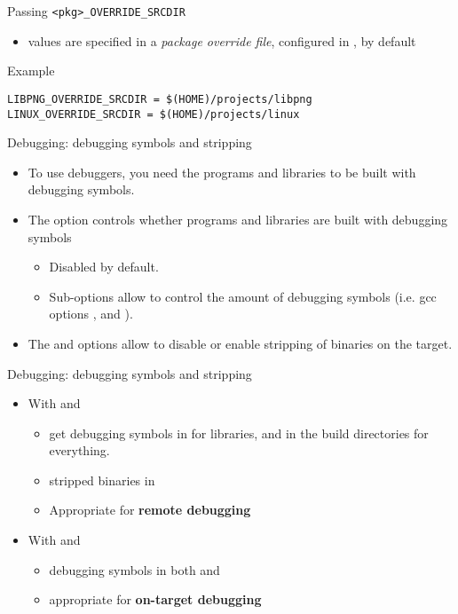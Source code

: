 \begin{frame}[fragile]{Passing {\tt <pkg>\_OVERRIDE\_SRCDIR}}
  \begin{itemize}
  \item {} values are specified in a {\em
      package override file}, configured in
    , by default
  \end{itemize}

  \begin{block}{Example }
\begin{verbatim}
LIBPNG_OVERRIDE_SRCDIR = $(HOME)/projects/libpng
LINUX_OVERRIDE_SRCDIR = $(HOME)/projects/linux
\end{verbatim}
  \end{block}
\end{frame}

\begin{frame}{Debugging: debugging symbols and stripping}
  \begin{itemize}
  \item To use debuggers, you need the programs and libraries to be
    built with debugging symbols.
  \item The  option controls whether programs
    and libraries are built with debugging symbols
    \begin{itemize}
    \item Disabled by default.
    \item Sub-options allow to control the amount of debugging symbols
      (i.e. gcc options ,  and ).
    \end{itemize}
  \item The  and  options
    allow to disable or enable stripping of binaries on the target.
  \end{itemize}
\end{frame}

\begin{frame}{Debugging: debugging symbols and stripping}
  \begin{itemize}
  \item With  and 
    \begin{itemize}
    \item get debugging symbols in  for
      libraries, and in the build directories for everything.
    \item stripped binaries in 
    \item Appropriate for {\bf remote debugging}
    \end{itemize}
  \item With  and 
    \begin{itemize}
    \item debugging symbols in both  and
    \item appropriate for {\bf on-target debugging}
    \end{itemize}
  \end{itemize}
\end{frame}

